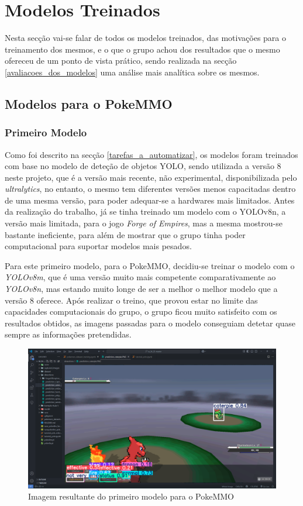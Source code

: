 \section{Modelos Treinados} \label{modelos_treinados}
Nesta secção vai-se falar de todos os modelos treinados, das motivações para o treinamento dos mesmos, e o que o grupo achou dos resultados que o mesmo ofereceu de um ponto de vista prático, sendo realizada na secção \ref{avaliacoes_dos_modelos} uma análise mais analítica sobre os mesmos.

\subsection{Modelos para o PokeMMO}
\subsubsection{Primeiro Modelo}
Como foi descrito na secção \ref{tarefas_a_automatizar}, os modelos foram treinados com base no modelo de deteção de objetos YOLO, sendo utilizada a versão 8 neste projeto, que é a versão mais recente, não experimental, disponibilizada pelo \textit{ultralytics}, no entanto, o mesmo tem diferentes versões menos capacitadas dentro de uma mesma versão, para poder adequar-se a hardwares mais limitados. Antes da realização do trabalho, já se tinha treinado um modelo com o YOLOv8n, a versão mais limitada, para o jogo \textit{Forge of Empires}, mas a mesma mostrou-se bastante ineficiente, para além de mostrar que o grupo tinha poder computacional para suportar modelos mais pesados.

Para este primeiro modelo, para o PokeMMO, decidiu-se treinar o modelo com o \textit{YOLOv8m}, que é uma versão muito mais competente comparativamente ao \textit{YOLOv8n}, mas estando muito longe de ser a melhor o melhor modelo que a versão 8 oferece. Após realizar o treino, que provou estar no limite das capacidades computacionais do grupo, o grupo ficou muito satisfeito com os resultados obtidos, as imagens passadas para o modelo conseguiam detetar quase sempre as informações pretendidas.

\begin{figure}[h]
    \centering
    \includegraphics[width=0.7\linewidth]{imagens/primeiro_modelo_exemplo.png}
    \caption{Imagem resultante do primeiro modelo para o PokeMMO}
    \label{fig:primeiro_modelo_exemplo}
\end{figure}

